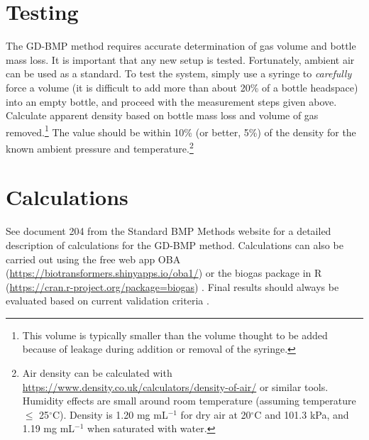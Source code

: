 \documentclass[]{article}
\begin{document}
\section{Testing}
The GD-BMP method requires accurate determination of gas volume and bottle mass loss.
It is important that any new setup is tested.
Fortunately, ambient air can be used as a standard.
To test the system, simply use a syringe to \textit{carefully} force a volume (it is difficult to add more than about 20\% of a bottle headspace) into an empty bottle, and proceed with the measurement steps given above. 
Calculate apparent density based on bottle mass loss and volume of gas removed.\footnote{This volume is typically smaller than the volume thought to be added because of leakage during addition or removal of the syringe.}
The value should be within 10\% (or better, 5\%) of the density for the known ambient pressure and temperature.\footnote{Air density can be calculated with \url{https://www.density.co.uk/calculators/density-of-air/} or similar tools. Humidity effects are small around room temperature (assuming temperature $\le$ 25$^\circ$C). Density is 1.20 mg mL$^{-1}$ for dry air at 20$^\circ$C and 101.3 kPa, and 1.19 mg mL$^{-1}$ when saturated with water.}

\section{Calculations}
See document 204 from the Standard BMP Methods website \citep{BMPdoc204gasdens} for a detailed description of calculations for the GD-BMP method.
Calculations can also be carried out using the free web app OBA (\url{https://biotransformers.shinyapps.io/oba1/}) or the biogas package in R (\url{https://cran.r-project.org/package=biogas}) \citep{hafnerSoftwareBiogasResearch2018}.
Final results should always be evaluated based on current validation criteria \citep{BMPdoc100req}.


\end{document}
